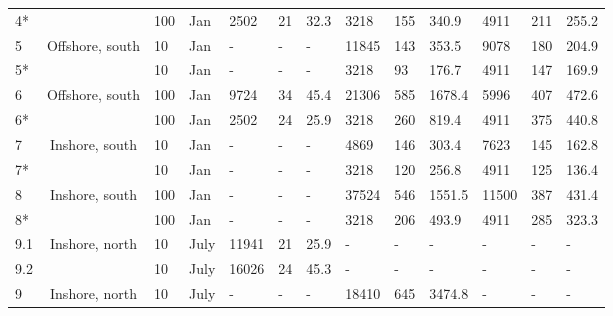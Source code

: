 {\begin{landscape}
\begin{table}[]
\begin{tabular}{@{}lclllllllllll@{}}
4*  &                                  & 100       & Jan   & 2502         & 21        & 32.3      & 3218         & 155       & 340.9     & 4911         & 211       & 255.2     \\
5   & \multirow{2}{*}{Offshore, south} & 10        & Jan   & -            & -         & -         & 11845        & 143       & 353.5     & 9078         & 180       & 204.9     \\
5*  &                                  & 10        & Jan   & -            & -         & -         & 3218         & 93        & 176.7     & 4911         & 147       & 169.9     \\
6   & \multirow{2}{*}{Offshore, south} & 100       & Jan   & 9724         & 34        & 45.4      & 21306        & 585       & 1678.4    & 5996         & 407       & 472.6     \\
6*  &                                  & 100       & Jan   & 2502         & 24        & 25.9      & 3218         & 260       & 819.4     & 4911         & 375       & 440.8     \\
7   & \multirow{2}{*}{Inshore, south}  & 10        & Jan   & -            & -         & -         & 4869         & 146       & 303.4     & 7623         & 145       & 162.8     \\
7*  &                                  & 10        & Jan   & -            & -         & -         & 3218         & 120       & 256.8     & 4911         & 125       & 136.4     \\
8   & \multirow{2}{*}{Inshore, south}  & 100       & Jan   & -            & -         & -         & 37524        & 546       & 1551.5    & 11500        & 387       & 431.4     \\
8*  &                                  & 100       & Jan   & -            & -         & -         & 3218         & 206       & 493.9     & 4911         & 285       & 323.3     \\
9.1 & \multirow{2}{*}{Inshore, north}  & 10        & July  & 11941        & 21        & 25.9      & -            & -         & -         & -            & -         & -         \\
9.2 &                                  & 10        & July  & 16026        & 24        & 45.3      & -            & -         & -         & -            & -         & -         \\
9   & Inshore, north                   & 10        & July  & -            & -         & -         & 18410        & 645       & 3474.8    & -            & -         & -         \\

\end{tabular}
\end{table}
\end{landscape}}
